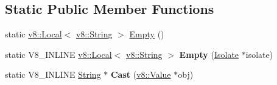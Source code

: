 \subsection*{Static Public Member Functions}
\begin{DoxyCompactItemize}
\item 
static \hyperlink{classv8_1_1_local}{v8\+::\+Local}$<$ \hyperlink{classv8_1_1_string}{v8\+::\+String} $>$ \hyperlink{classv8_1_1_string_a93009e63fb89a2c8264b87ec422af963}{Empty} ()
\item 
\hypertarget{classv8_1_1_string_aa393d47baa54467fe57001065e49194b}{}static V8\+\_\+\+I\+N\+L\+I\+N\+E \hyperlink{classv8_1_1_local}{v8\+::\+Local}$<$ \hyperlink{classv8_1_1_string}{v8\+::\+String} $>$ {\bfseries Empty} (\hyperlink{classv8_1_1_isolate}{Isolate} $\ast$isolate)\label{classv8_1_1_string_aa393d47baa54467fe57001065e49194b}

\item 
\hypertarget{classv8_1_1_string_a826d60798dc152cea64a7636737b03b9}{}static V8\+\_\+\+I\+N\+L\+I\+N\+E \hyperlink{classv8_1_1_string}{String} $\ast$ {\bfseries Cast} (\hyperlink{classv8_1_1_value}{v8\+::\+Value} $\ast$obj)\label{classv8_1_1_string_a826d60798dc152cea64a7636737b03b9}


\end{DoxyCompactItemize}
